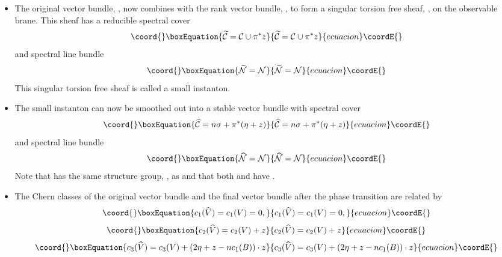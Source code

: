 \documentclass[a4paper,12pt]{article}
\numberwithin{equation}{section}
\def\cC{{\mathcal C}}
\def\cN{{\mathcal N}}
\theoremstyle{plain}
\begin{document}
\begin{itemize}
\item The original vector bundle, \coordHE{}, now combines with the rank \coordHE{} vector
bundle, \coordHE{}, to form a singular torsion free sheaf, 
\coordHE{}, on the observable
brane. This sheaf has a reducible spectral cover
\begin{equation}\coord{}\boxEquation{
\widetilde{\cC}={\cal{C}} \cup \pi^{*}z
\label{eq:96}
}{
\widetilde{\cC}={\cal{C}} \cup \pi^{*}z
}{ecuacion}\coordE{}\end{equation}
and spectral line bundle
\begin{equation}\coord{}\boxEquation{
\widetilde{\cN}=\cN
\label{eq:97}
}{
\widetilde{\cN}=\cN
}{ecuacion}\coordE{}\end{equation}
This singular torsion free sheaf is called a small instanton.

\item The small instanton can now be smoothed out into a stable \coordHE{}
vector bundle \coordHE{} with spectral cover
\begin{equation}\coord{}\boxEquation{
\widehat{\cC}= n\sigma+ \pi^{*}(\eta+z)
\label{eq:98}
}{
\widehat{\cC}= n\sigma+ \pi^{*}(\eta+z)
}{ecuacion}\coordE{}\end{equation}
and spectral line bundle
\begin{equation}\coord{}\boxEquation{
\widehat{\cN}=\cN
\label{eq:99}
}{
\widehat{\cN}=\cN
}{ecuacion}\coordE{}\end{equation}
Note that \coordHE{} has the same structure group, \coordHE{}, as \coordHE{} and that both
\myHighlight{$\widehat{\cN}$}\coordHE{} and \myHighlight{$\cN$}\coordHE{} have \coordHE{}.

\item The Chern classes of the original vector bundle \coordHE{} and the final 
vector bundle \coordHE{} after the phase transition are related by
\begin{equation}\coord{}\boxEquation{
c_{1}(\widehat{V})=c_{1}(V)=0,
\label{eq:100}
}{
c_{1}(\widehat{V})=c_{1}(V)=0,
}{ecuacion}\coordE{}\end{equation}
\begin{equation}\coord{}\boxEquation{
c_{2}(\widehat{V})=c_{2}(V) +z
\label{eq:101}
}{
c_{2}(\widehat{V})=c_{2}(V) +z
}{ecuacion}\coordE{}\end{equation}
\begin{equation}\coord{}\boxEquation{
c_{3}(\widehat{V})=c_{3}(V)+ (2\eta+z-nc_{1}(B))\cdot z
\label{eq:102}
}{
c_{3}(\widehat{V})=c_{3}(V)+ (2\eta+z-nc_{1}(B))\cdot z
}{ecuacion}\coordE{}\end{equation}

\end{itemize}
\end{document}

